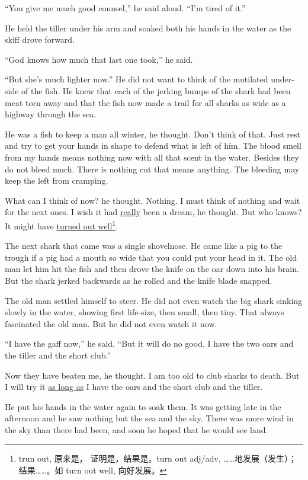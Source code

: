 \documentclass[fontset=ubuntu]{ctexrep}
\begin{document}
``You give me much good \gls{counsel},'' he said aloud. ``I'm tired of it.''

He held the tiller under his arm and soaked both his hands in the water as
the skiff drove forward.

``God knows how much that last one took,'' he said.

``But she's much lighter now.'' He did not want to think of the mutilated
under-side of the fish. He knew that each of the jerking \glspl{bump}
of the shark had been meat \gls{torn} away and that the fish now made a
trail for all sharks as wide as a \gls{highway} through the sea.

He was a fish to keep a man all winter, he thought. Don't think of that.
Just rest and try to get your hands in shape to defend what is left of him.
The blood smell from my hands means nothing now with all that scent in the
water. Besides they do not bleed much. There is nothing cut that means
anything. The bleeding may keep the left from cramping.

What can I think of now? he thought. Nothing. I must think of nothing and
wait for the next ones. I wish it had \uline{really} been a dream, he thought.
But who knows? It might have \uline{turned out well}\footnote{trun out, 原来是，
  证明是，结果是。turn out adj/adv, ……地发展（发生）；结果……。如 turn
  out well, 向好发展。}.

The next shark that came was a single shovelnose. He came like a pig to the
trough if a pig had a mouth so wide that you could put your head in it. The
old man let him hit the fish and then drove the knife on the oar down into
his brain. But the shark jerked backwards as he rolled and the knife blade
snapped.

The old man settled himself to steer. He did not even watch the big shark
sinking slowly in the water, showing first \gls{life-size}, then small, then
tiny. That always \gls{fascinated} the old man. But he did not even watch it now.

``I have the gaff now,'' he said. ``But it will do no good. I have the two
oars and the tiller and the short club.''

Now they have beaten me, he thought. I am too old to club sharks to death.
But I will try it \uline{as long as} I have the oars and the short club and the
tiller.

He put his hands in the water again to soak them. It was getting late in the
afternoon and he saw nothing but the sea and the sky. There was more wind in
the sky than there had been, and soon he hoped that he would see land.
\end{document}
